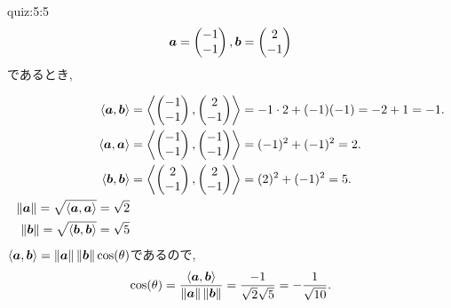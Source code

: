 \begin{answerof}{quiz:5:5}
  \begin{align*}
    \boldsymbol{a}=\begin{pmatrix}-1\\-1\end{pmatrix},
    \boldsymbol{b}=\begin{pmatrix}2\\-1\end{pmatrix}
  \end{align*}
  であるとき,

  \begin{align*}
    \Braket{\boldsymbol{a},\boldsymbol{b}}
    &=\Braket{\begin{pmatrix}-1\\-1\end{pmatrix},\begin{pmatrix}2\\-1\end{pmatrix}}
    =-1\cdot2+(-1)(-1)=-2+1=-1.
    \\
    \Braket{\boldsymbol{a},\boldsymbol{a}}
    &=\Braket{\begin{pmatrix}-1\\-1\end{pmatrix},\begin{pmatrix}-1\\-1\end{pmatrix}}
    =(-1)^2+(-1)^2=2.
\\
    \Braket{\boldsymbol{b},\boldsymbol{b}}
    &=\Braket{\begin{pmatrix}2\\-1\end{pmatrix},\begin{pmatrix}2\\-1\end{pmatrix}}
    =(2)^2+(-1)^2=5.
    \\
    \|\boldsymbol{a}\|
    =\sqrt{\Braket{\boldsymbol{a},\boldsymbol{a}}}
    =\sqrt{2}
\\
    \|\boldsymbol{b}\|
    =\sqrt{\Braket{\boldsymbol{b},\boldsymbol{b}}}
    =\sqrt{5}
  \end{align*}
  $\Braket{\boldsymbol{a},\boldsymbol{b}}=\left\|\boldsymbol{a}\right\|\left\|\boldsymbol{b}\right\|\cos(\theta)$であるので,
  \begin{align*}
    \cos(\theta)=\frac{\Braket{\boldsymbol{a},\boldsymbol{b}}}{\left\|\boldsymbol{a}\right\|\left\|\boldsymbol{b}\right\|}
=\frac{-1}{\sqrt{2}\sqrt{5}}
=-\frac{1}{\sqrt{10}}.
  \end{align*}
\end{answerof}

